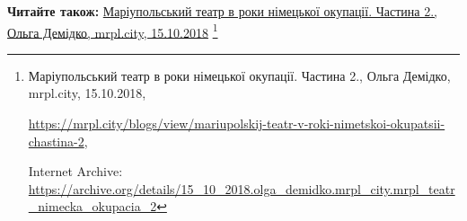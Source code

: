  
 
 
 
 

\textbf{Читайте також:} \href{https://archive.org/details/15_10_2018.olga_demidko.mrpl_city.mrpl_teatr_nimecka_okupacia_2}{%
Маріупольський театр в роки німецької окупації. Частина 2., Ольга Демідко, mrpl.city, 15.10.2018}%
\footnote{Маріупольський театр в роки німецької окупації. Частина 2., Ольга Демідко, mrpl.city, 15.10.2018, \par\url{https://mrpl.city/blogs/view/mariupolskij-teatr-v-roki-nimetskoi-okupatsii-chastina-2}, \par Internet Archive: \url{https://archive.org/details/15_10_2018.olga_demidko.mrpl_city.mrpl_teatr_nimecka_okupacia_2}}
